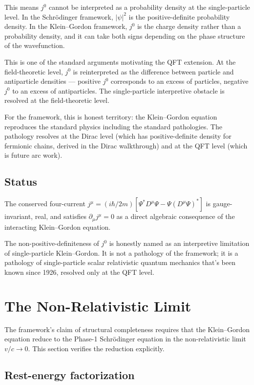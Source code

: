 \documentclass[11pt,a4paper]{article}
\begin{document}
This means $j^0$ cannot be interpreted as a probability density at the single-particle level. In the Schr\"odinger framework, $|\psi|^2$ is the positive-definite probability density. In the Klein--Gordon framework, $j^0$ is the charge density rather than a probability density, and it can take both signs depending on the phase structure of the wavefunction.

This is one of the standard arguments motivating the QFT extension. At the field-theoretic level, $j^0$ is reinterpreted as the difference between particle and antiparticle densities --- positive $j^0$ corresponds to an excess of particles, negative $j^0$ to an excess of antiparticles. The single-particle interpretive obstacle is resolved at the field-theoretic level.

For the framework, this is honest territory: the Klein--Gordon equation reproduces the standard physics including the standard pathologies. The pathology resolves at the Dirac level (which has positive-definite density for fermionic chains, derived in the Dirac walkthrough) and at the QFT level (which is future arc work).

\subsection{Status}

The conserved four-current $j^\mu = (i\hbar/2m)[\Psi^* D^\mu\Psi - \Psi(D^\mu\Psi)^*]$ is gauge-invariant, real, and satisfies $\partial_\mu j^\mu = 0$ as a direct algebraic consequence of the interacting Klein--Gordon equation.

The non-positive-definiteness of $j^0$ is honestly named as an interpretive limitation of single-particle Klein--Gordon. It is not a pathology of the framework; it is a pathology of single-particle scalar relativistic quantum mechanics that's been known since 1926, resolved only at the QFT level.

\section{The Non-Relativistic Limit}

The framework's claim of structural completeness requires that the Klein--Gordon equation reduce to the Phase-1 Schr\"odinger equation in the non-relativistic limit $v/c \to 0$. This section verifies the reduction explicitly.

\subsection{Rest-energy factorization}
\end{document}
